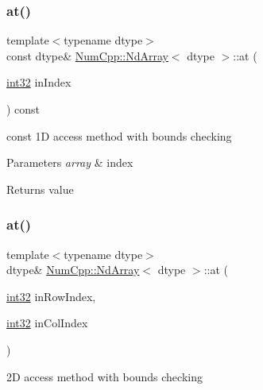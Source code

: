 \subsubsection{\texorpdfstring{at()}{at()}\hspace{0.1cm}{\footnotesize\ttfamily [2/8]}}
{\footnotesize\ttfamily template$<$typename dtype$>$ \\
const dtype\& \mbox{\hyperlink{class_num_cpp_1_1_nd_array}{Num\+Cpp\+::\+Nd\+Array}}$<$ dtype $>$\+::at (\begin{DoxyParamCaption}\item[{\mbox{\hyperlink{namespace_num_cpp_acf3eb1592f8b248ff0a236634864633c}{int32}}}]{in\+Index }\end{DoxyParamCaption}) const\hspace{0.3cm}{\ttfamily [inline]}}

const 1D access method with bounds checking


\begin{DoxyParams}{Parameters}
{\em array} & index \\
\hline
\end{DoxyParams}
\begin{DoxyReturn}{Returns}
value 
\end{DoxyReturn}
\mbox{\label{class_num_cpp_1_1_nd_array_a2872127505158e882699d269ef25ef89}} 
\subsubsection{\texorpdfstring{at()}{at()}\hspace{0.1cm}{\footnotesize\ttfamily [3/8]}}
{\footnotesize\ttfamily template$<$typename dtype$>$ \\
dtype\& \mbox{\hyperlink{class_num_cpp_1_1_nd_array}{Num\+Cpp\+::\+Nd\+Array}}$<$ dtype $>$\+::at (\begin{DoxyParamCaption}\item[{\mbox{\hyperlink{namespace_num_cpp_acf3eb1592f8b248ff0a236634864633c}{int32}}}]{in\+Row\+Index,  }\item[{\mbox{\hyperlink{namespace_num_cpp_acf3eb1592f8b248ff0a236634864633c}{int32}}}]{in\+Col\+Index }\end{DoxyParamCaption})\hspace{0.3cm}{\ttfamily [inline]}}

2D access method with bounds checking


